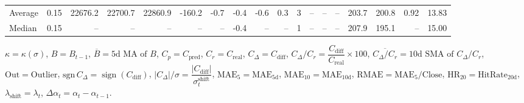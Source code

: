 \begin{threeparttable}
{\begin{tabular}{lrrrrrrrrrrrrrrrrr}
Average &     0.15 & 22676.2 & 22700.7 & 22860.9 &     -160.2 &           -0.7 &                      -0.4 &                     -0.6 &                 0.3 &              3 &         -- &        -- &             -- &            203.7 &               200.8 &            0.92 &                  13.83 \\
 Median &     0.15 &      -- &      -- &      -- &         -- &             -- &                      -0.4 &                       -- &                  -- &              1 &         -- &        -- &             -- &            207.9 &               195.1 &              -- &                  15.00 \\
\bottomrule
\end{tabular}
}
\begin{tablenotes}\footnotesize
\item $\kappa=\kappa(\sigma)$, $B=B_{t-1}$, $\overline{B}=\text{5d MA of }B$, $C_p=C_{\text{pred}}$, $C_r=C_{\text{real}}$, $C_\Delta=C_{\text{diff}}$, $C_\Delta/C_r=\dfrac{C_{\text{diff}}}{C_{\text{real}}}\times100$, $\overline{C_\Delta/C_r}=\text{10d SMA of }C_\Delta/C_r$, $\mathrm{Out}=\text{Outlier}$, $\mathrm{sgn}\,C_\Delta=\operatorname{sign}(C_{\text{diff}})$, $|C_\Delta|/\sigma=\dfrac{|C_{\text{diff}}|}{\sigma_t^{\text{shift}}}$, $\mathrm{MAE}_5=\mathrm{MAE}_{5\text{d}}$, $\mathrm{MAE}_{10}=\mathrm{MAE}_{10\text{d}}$, $\mathrm{RMAE}= \mathrm{MAE}_5 / \text{Close}$, $\mathrm{HR}_{20}=\mathrm{HitRate}_{20\text{d}}$, $\lambda_{\text{shift}}=\lambda_t$, $\Delta\alpha_t=\alpha_t-\alpha_{t-1}$.
\end{tablenotes}
\end{threeparttable}
\endgroup

